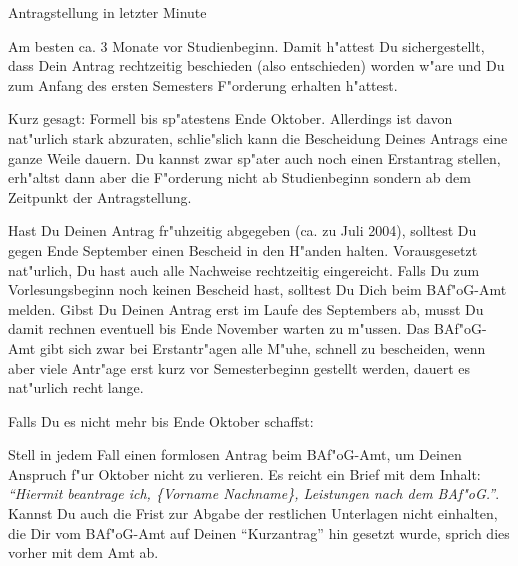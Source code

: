 \begin{artikel}{Antragstellung in letzter Minute}
\vspace*{-1ex}%

Am besten ca. 3 Monate vor Studienbeginn. Damit h"attest Du sichergestellt, dass Dein Antrag rechtzeitig beschieden (also entschieden) worden w"are und Du zum Anfang des ersten Semesters F"orderung erhalten h"attest.

Kurz gesagt: Formell bis sp"atestens Ende Oktober. Allerdings ist davon nat"urlich stark abzuraten, schlie"slich kann die Bescheidung Deines Antrags eine ganze Weile dauern. Du kannst zwar sp"ater auch noch einen Erstantrag stellen, erh"altst dann aber die F"orderung nicht ab Studienbeginn sondern ab dem Zeitpunkt der Antragstellung.

Hast Du Deinen Antrag fr"uhzeitig abgegeben (ca. zu Juli 2004), solltest Du gegen Ende September einen Bescheid in den H"anden halten. Vorausgesetzt nat"urlich, Du hast auch alle Nachweise rechtzeitig eingereicht. Falls Du zum Vorlesungsbeginn noch keinen Bescheid hast, solltest Du Dich beim BAf"oG-Amt melden. Gibst Du Deinen Antrag erst im Laufe des Septembers ab, musst Du damit rechnen eventuell bis Ende November warten zu m"ussen. Das BAf"oG-Amt gibt sich zwar bei Erstantr"agen alle M"uhe, schnell zu bescheiden, wenn aber viele Antr"age erst kurz vor Semesterbeginn gestellt werden, dauert es nat"urlich recht lange. 

Falls Du es nicht mehr bis Ende Oktober schaffst: 

Stell in jedem Fall einen formlosen Antrag beim BAf"oG-Amt, um Deinen Anspruch f"ur Oktober nicht zu verlieren. Es reicht ein Brief mit dem Inhalt: \textit{"`Hiermit beantrage ich, \textit{\{Vorname Nachname\}}, Leistungen nach dem BAf"oG."'}. Kannst Du auch die Frist zur Abgabe der restlichen Unterlagen nicht einhalten, die Dir vom BAf"oG-Amt auf Deinen "`Kurzantrag"' hin gesetzt wurde, sprich dies vorher mit dem Amt ab.
\end{artikel}
